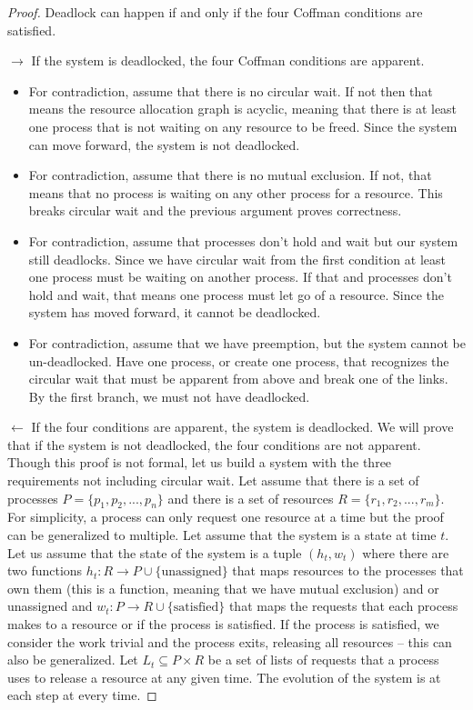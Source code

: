 \begin{proof} Deadlock can happen if and only if the four Coffman conditions are satisfied.
	
	$\rightarrow$ If the system is deadlocked, the four Coffman conditions are apparent.
	
	\begin{itemize}
		\item For contradiction, assume that there is no circular wait. If not then that means the resource allocation graph is acyclic, meaning that there is at least one process that is not waiting on any resource to be freed. Since the system can move forward, the system is not deadlocked.
		\item For contradiction, assume that there is no mutual exclusion. If not, that means that no process is waiting on any other process for a resource. This breaks circular wait and the previous argument proves correctness.
		\item For contradiction, assume that processes don't hold and wait but our system still deadlocks. Since we have circular wait from the first condition at least one process must be waiting on another process. If that and processes don't hold and wait, that means one process must let go of a resource. Since the system has moved forward, it cannot be deadlocked.
		\item For contradiction, assume that we have preemption, but the system cannot be un-deadlocked. Have one process, or create one process, that recognizes the circular wait that must be apparent from above and break one of the links. By the first branch, we must not have deadlocked.
	\end{itemize}
	
	$\leftarrow$ If the four conditions are apparent, the system is deadlocked.
	We will prove that if the system is not deadlocked, the four conditions are not apparent.
	Though this proof is not formal, let us build a system with the three requirements not including circular wait.
	Let assume that there is a set of processes $P = \{p_1, p_2, ..., p_n\}$ and there is a set of resources $R = \{r_1, r_2, ..., r_m\}$.
	For simplicity, a process can only request one resource at a time but the proof can be generalized to multiple.
	Let assume that the system is a state at time $t$.
	Let us assume that the state of the system is a tuple $(h_t, w_t)$ where there are two functions $h_t: R \rightarrow P \cup \{\text{unassigned}\}$ that maps resources to the processes that own them (this is a function, meaning that we have mutual exclusion) and or unassigned and $w_t: P \rightarrow R \cup \{\text{satisfied}\}$ that maps the requests that each process makes to a resource or if the process is satisfied.
	If the process is satisfied, we consider the work trivial and the process exits, releasing all resources -- this can also be generalized.
	Let $L_t \subseteq P \times R$ be a set of lists of requests that a process uses to release a resource at any given time.
	The evolution of the system is at each step at every time.
	

\end{proof}
